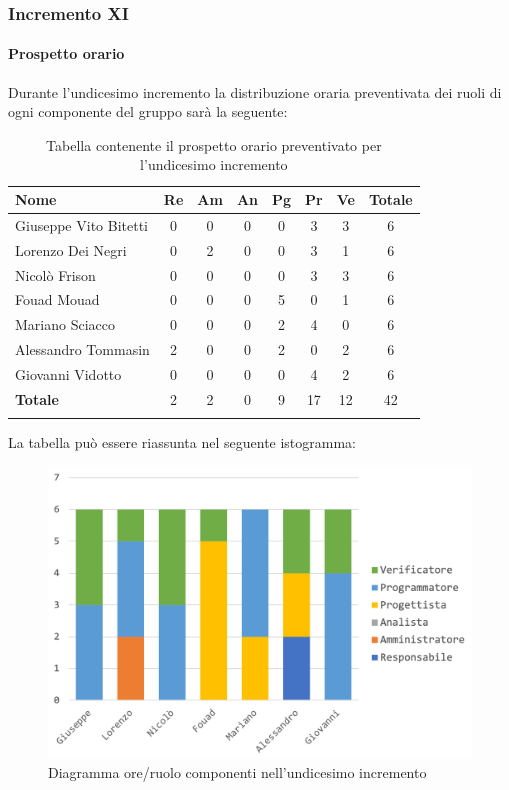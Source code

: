 		
	\subsubsection{Incremento XI}
		\paragraph{Prospetto orario}
		Durante l'undicesimo incremento la distribuzione oraria preventivata dei ruoli di ogni componente del gruppo sarà la seguente:
		
		\begin{longtable}{|l|c|c|c|c|c|c|c|}
			\hline
			\rowcolor{lighter-grayer}
			\textbf{Nome} & \textbf{Re} & \textbf{Am} & \textbf{An} & \textbf{Pg}  & \textbf{Pr}   & \textbf{Ve} & \textbf{Totale} \\
			\hline
			\endfirsthead
			
			\hline
			Giuseppe Vito Bitetti 		 & 0 & 0 & 0 & 0 & 3 & 3 & 6\\
			\hline
			\hline
			Lorenzo Dei Negri			 & 0 & 2 & 0 & 0 & 3 & 1 & 6\\
			\hline
			\hline
			Nicolò Frison				      & 0 & 0 & 0 & 0 & 3 & 3 & 6\\
			\hline
			\hline
			Fouad Mouad 				   & 0 & 0 & 0 & 5 & 0 & 1 & 6\\
			\hline
			\hline
			Mariano Sciacco 			 & 0 & 0 & 0 & 2 & 4 & 0 & 6\\
			\hline
			\hline
			Alessandro Tommasin    & 2 & 0 & 0 & 2 & 0 & 2 & 6\\
			\hline
			\hline
			Giovanni Vidotto 			  & 0 & 0 & 0 & 0 & 4 & 2 & 6\\
			\hline 
			\textbf{Totale}			 		& 2 & 2 & 0 & 9 & 17 & 12 & 42\\
			\hline
			\caption{Tabella contenente il prospetto orario preventivato per l'undicesimo incremento}
		\end{longtable}
		
		La tabella può essere riassunta nel seguente istogramma:
		\begin{figure}[H]
			\centering
			\includegraphics[width=0.8\linewidth]{./images/preventivo/incremento11-1.png}
			\caption{Diagramma ore/ruolo componenti nell'undicesimo incremento}
			\label{fig:diagramma suddivione ruoli incremento XI}
		\end{figure}
		\pagebreak
		

